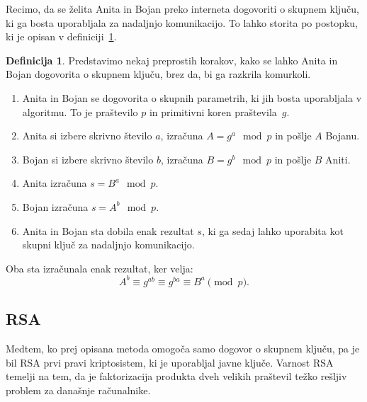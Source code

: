 \documentclass[12pt,a4paper,openany,tikz]{book}
\theoremstyle{plain}
\theoremstyle{definition}
\newtheorem{defn}[thm]{Definicija} %
\begin{document}
Recimo, da se želita Anita in Bojan preko interneta dogovoriti o skupnem ključu, ki ga bosta uporabljala za nadaljnjo komunikacijo. To lahko storita po postopku, ki je opisan v definiciji~\ref{def:dhprob}.

\begin{mdframed}[frametitle={Dogovor o ključu Diffe-Hellman}]
\begin{minipage}{\textwidth}
\begin{defn} Predstavimo nekaj preprostih korakov, kako se lahko Anita in Bojan dogovorita o skupnem ključu, brez da, bi ga razkrila komurkoli.
\begin{enumerate}
	\item Anita in Bojan se dogovorita o skupnih parametrih, ki jih bosta uporabljala v algoritmu. To je praštevilo $p$ in primitivni koren praštevila~$g$.
	\item Anita si izbere skrivno število $a$, izračuna $A=g^a \mod p$ in pošlje $A$ Bojanu.
	\item Bojan si izbere skrivno število $b$, izračuna $B=g^b \mod p$ in pošlje $B$ Aniti.
	\item Anita izračuna $s=B^a \mod p$.
	\item Bojan izračuna $s=A^b \mod p$.
	\item Anita in Bojan sta dobila enak rezultat $s$, ki ga sedaj lahko uporabita kot skupni ključ za nadaljnjo komunikacijo.
\end{enumerate}
Oba sta izračunala enak rezultat, ker velja:
$$
A^b \equiv g^{ab} \equiv g^{ba} \equiv B^a \pmod p.
$$
\label{def:dhprob}
\end{defn}
\end{minipage}
\end{mdframed}


\subsection*{RSA}
\label{sub:RSA}

Medtem, ko prej opisana metoda omogoča samo dogovor o skupnem ključu, pa je bil \gls{RSA} prvi pravi kriptosistem, ki je uporabljal javne ključe. Varnost \gls{RSA} temelji na tem, da je faktorizacija produkta dveh velikih praštevil težko rešljiv problem za današnje računalnike.
\end{document}
